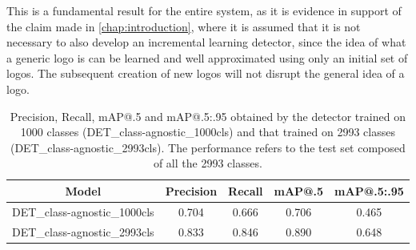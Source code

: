 This is a fundamental result for the entire system, as it is evidence in support of the claim made in \autoref{chap:introduction}, where it is assumed that it is not necessary to also develop an incremental learning detector, since the idea of what a generic logo is can be learned and well approximated using only an initial set of logos. The subsequent creation of new logos will not disrupt the general idea of a logo.

\begin{table}[H]
    \centering
    \begin{tabular}{c|c|c|c|c}
        \hline
        \textbf{Model} &
        \textbf{Precision} &
        \textbf{Recall} &
        \textbf{mAP@.5} &
        \textbf{mAP@.5:.95} \\
        \hline
        \hline
DET\_class-agnostic\_1000cls&0.704&0.666&0.706&0.465\\
DET\_class-agnostic\_2993cls&0.833&0.846&0.890&0.648\\
\hline
\end{tabular}
\caption{Precision, Recall, mAP@.5 and mAP@.5:.95 obtained by the detector trained on 1000 classes (DET\_class-agnostic\_1000cls) and that trained on 2993 classes (DET\_class-agnostic\_2993cls). The performance refers to the test set composed of all the 2993 classes.}
    \label{table:exp-det_2993}
\end{table}


